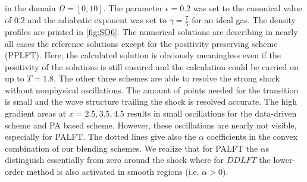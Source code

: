 	in the domain $\Omega = [0, 10]$. The parameter $\epsilon = 0.2$ was set to the canonical  value of $0.2$ and the adiabatic exponent was set to $\gamma=\frac 7 5$ for an ideal gas. The density profiles  are printed in \cref{fig:SO6}. The numerical solutions are describing in nearly all cases the reference solutions   except for the positivity preserving scheme (PPLFT). Here, the calculated solution is obviously meaningless even if the positivity of the solutions is still ensured and the calculation could be carried on up to $T= 1.8$. The other three schemes  are able to resolve the strong shock without nonphysical oscillations. The amount of points needed for the transition is small and the wave structure trailing the shock is resolved accurate. The high gradient areas at $x=2.5, 3.5, 4.5$ results in small oscillations for the data-driven scheme   and PA based scheme. However, these oscillations are nearly not visible, especially for PALFT.  The dotted lines give also the $\alpha$ coefficients in the convex combination of our blending schemes. We  realize that for PALFT 
the $\alpha$s distinguish essentially from zero around the shock where for $DDLFT$ the lower-order method is also activated in smooth regions (i.e. $\alpha>0$).
	
